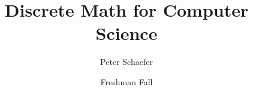 



\title{Discrete Math for Computer Science}
\author{Peter Schaefer}
\date{Freshman Fall}



\maketitle
\tableofcontents
\newpage
















